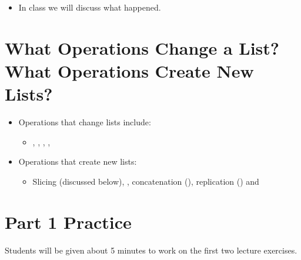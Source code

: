 \documentclass[letterpaper,10pt,english]{sphinxmanual}
\begin{document}
\begin{itemize}
\begin{sphinxVerbatim}[commandchars=\\\{\}]
  \PYG{p}{[}     \PYG{p}{]}

 
 
 
\end{sphinxVerbatim}

\item {} 
In class we will discuss what happened.

\end{itemize}


\section{What Operations Change a List? What Operations Create New Lists?}
\label{\detokenize{lecture_notes/lec10_lists2:what-operations-change-a-list-what-operations-create-new-lists}}\begin{itemize}
\item {} 
Operations that change lists include:
\begin{itemize}
\item {} 
, , , , 

\end{itemize}

\item {} 
Operations that create new lists:
\begin{itemize}
\item {} 
Slicing (discussed below), , concatenation (\sphinxcode{\sphinxupquote{+}}),
replication (\sphinxcode{\sphinxupquote{*}}) and 

\end{itemize}

\end{itemize}


\section{Part 1 Practice}
\label{\detokenize{lecture_notes/lec10_lists2:part-1-practice}}
Students will be given about 5 minutes to work on the first two
lecture exercises.
\end{document}
